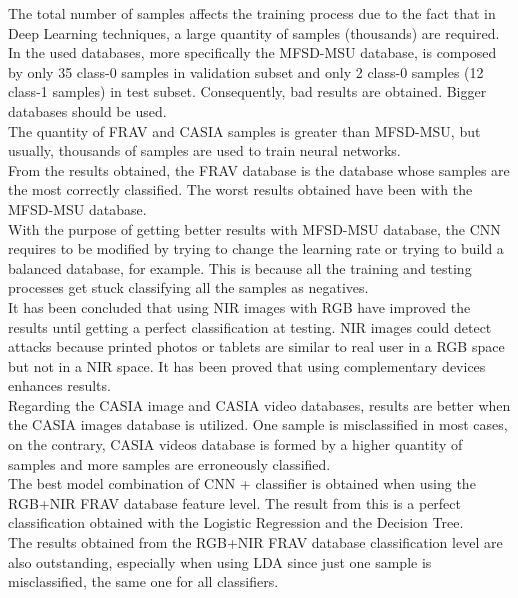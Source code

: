 The total number of samples affects the training process due to the fact that in Deep Learning techniques, a large quantity of samples (thousands) are required. In the used databases, more specifically the MFSD-MSU database, is composed by only 35 class-0 samples in validation subset and only 2 class-0 samples (12 class-1 samples) in test subset. Consequently, bad results are obtained. Bigger databases should be used.\\

The quantity of FRAV and CASIA samples is greater than MFSD-MSU, but usually, thousands of samples are used to train neural networks.\\

From the  results obtained, the FRAV database is the database whose samples are the most correctly classified. The worst results obtained have been with the MFSD-MSU database.\\

With the purpose of getting better results with MFSD-MSU database, the CNN requires to be modified by trying to change the learning rate or trying to build a balanced database, for example. This is because all the training and testing processes get stuck classifying all the samples as negatives.\\

It has been concluded that using NIR images with RGB have improved the results until getting a perfect classification at testing. NIR images could detect attacks because printed photos or tablets are similar to real user in a RGB space but not in a NIR space. It has been proved that using complementary devices enhances results.\\

Regarding the CASIA image and CASIA video databases, results are  better when the CASIA images database is utilized. One sample is misclassified in most cases, on the contrary, CASIA videos database is formed by a higher quantity of samples and more samples are erroneously classified.\\

The best model combination of CNN + classifier is obtained when using the RGB+NIR FRAV database feature level. The result from this is a perfect classification obtained with the Logistic Regression and the Decision Tree.\\

The results obtained from the RGB+NIR FRAV database classification level are also outstanding, especially when using LDA since just one sample is misclassified, the same one for all classifiers.\\

